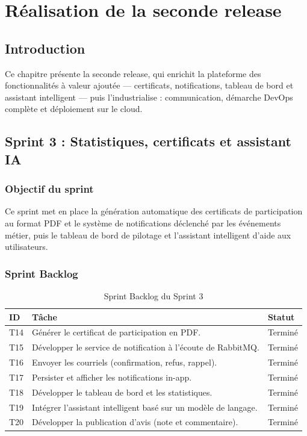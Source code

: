 \chapter{Réalisation de la seconde release}
\minitoc
\vspace{0.6cm}

\section*{Introduction}
Ce chapitre présente la seconde release, qui enrichit la plateforme des fonctionnalités à
valeur ajoutée — certificats, notifications, tableau de bord et assistant intelligent — puis
l'industrialise : communication, démarche DevOps complète et déploiement sur le cloud.

\section{Sprint 3 : Statistiques, certificats et assistant IA}

\subsection{Objectif du sprint}
Ce sprint met en place la génération automatique des certificats de participation au format
PDF et le système de notifications déclenché par les événements métier, puis le tableau de
bord de pilotage et l'assistant intelligent d'aide aux utilisateurs.

\subsection{Sprint Backlog}
\begin{table}[H]\centering\renewcommand{\arraystretch}{1.25}
\begin{tabular}{|p{1cm}|p{10.5cm}|p{1.6cm}|}\hline
\rowcolor{gray!15}\textbf{ID} & \textbf{Tâche} & \textbf{Statut} \\ \hline
T14 & Générer le certificat de participation en PDF. & Terminé \\ \hline
T15 & Développer le service de notification à l'écoute de RabbitMQ. & Terminé \\ \hline
T16 & Envoyer les courriels (confirmation, refus, rappel). & Terminé \\ \hline
T17 & Persister et afficher les notifications in-app. & Terminé \\ \hline
T18 & Développer le tableau de bord et les statistiques. & Terminé \\ \hline
T19 & Intégrer l'assistant intelligent basé sur un modèle de langage. & Terminé \\ \hline
T20 & Développer la publication d'avis (note et commentaire). & Terminé \\ \hline
\end{tabular}
\caption{Sprint Backlog du Sprint 3}\label{tab:sb3}
\end{table}

